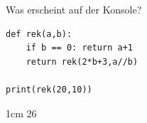 \question[2]
Was erscheint auf der Konsole?
\begin{lstlisting}
def rek(a,b):
    if b == 0: return a+1
    return rek(2*b+3,a//b)

print(rek(20,10))
\end{lstlisting}
\begin{solutionbox}{1cm}
26
\end{solutionbox}
